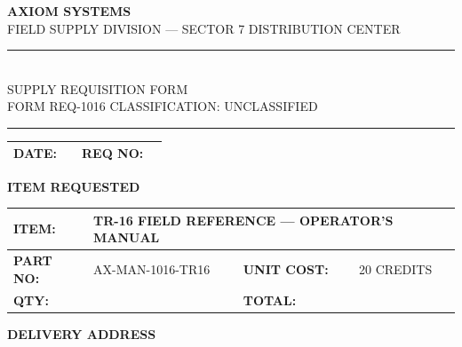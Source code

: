 \documentclass[10pt]{article}
\begin{document}
\begin{center}
{\Large\bfseries AXIOM SYSTEMS}\\[1pt]
{\small FIELD SUPPLY DIVISION --- SECTOR 7 DISTRIBUTION CENTER}\\[4pt]
\rule{\textwidth}{1.5pt}\\[2pt]
{\large SUPPLY REQUISITION FORM}\\[1pt]
{\small FORM REQ-1016 \hfill CLASSIFICATION: UNCLASSIFIED}\\[2pt]
\rule{\textwidth}{1.5pt}
\end{center}

\vspace{6pt}

\begin{tabularx}{\textwidth}{|l|X|l|X|}
\hline
\textbf{DATE:} & \rule{0pt}{1.2em} & \textbf{REQ NO:} & \\[0.5em]
\hline
\end{tabularx}

\vspace{6pt}

{\bfseries ITEM REQUESTED}\\[2pt]
\begin{tabularx}{\textwidth}{|l|X|l|X|}
\hline
\textbf{ITEM:} & \multicolumn{3}{l|}{TR-16 FIELD REFERENCE --- OPERATOR'S MANUAL} \\[0.2em]
\hline
\textbf{PART NO:} & AX-MAN-1016-TR16 & \textbf{UNIT COST:} & 20 CREDITS \\[0.2em]
\hline
\textbf{QTY:} & & \textbf{TOTAL:} & \\[0.5em]
\hline
\end{tabularx}

\vspace{6pt}

{\bfseries DELIVERY ADDRESS}\\[2pt]
\end{document}

